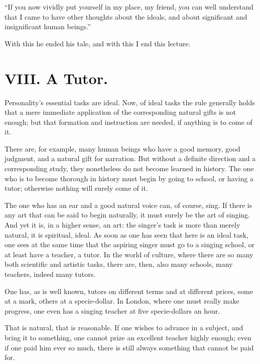 \documentclass[12pt,a4paper]{book}
\begin{document}
``If you now vividly put yourself in my place, my friend, you can well understand that I came to have other thoughts about the ideals, and about significant and insignificant human beings.''

With this he ended his tale, and with this I end this lecture.

\chapter*{VIII. A Tutor.}
\label{ch:forel8}

Personality's essential tasks are ideal. Now, of ideal tasks the rule generally holds that a mere immediate application of the corresponding natural gifts is not enough; but that formation and instruction are needed, if anything is to come of it.

There are, for example, many human beings who have a good memory, good judgment, and a natural gift for narration. But without a definite direction and a corresponding study, they nonetheless do not become learned in history. The one who is to become thorough in history must begin by going to school, or having a tutor; otherwise nothing will surely come of it.

The one who has an ear and a good natural voice can, of course, sing. If there is any art that can be said to begin naturally, it must surely be the art of singing. And yet it is, in a higher sense, an art: the singer's task is more than merely natural, it is spiritual, ideal. As soon as one has seen that here is an ideal task, one sees at the same time that the aspiring singer must go to a singing school, or at least have a teacher, a tutor.
In the world of culture, where there are so many both scientific and artistic tasks, there are, then, also many schools, many teachers, indeed many tutors.

One has, as is well known, tutors on different terms and at different prices, some at a mark, others at a specie-dollar. In London, where one must really make progress, one even has a singing teacher at five specie-dollars an hour.

That is natural, that is reasonable. If one wishes to advance in a subject, and bring it to something, one cannot prize an excellent teacher highly enough; even if one paid him ever so much, there is still always something that cannot be paid for.
\end{document}
